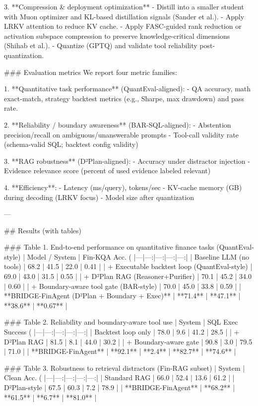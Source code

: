 3. **Compression & deployment optimization**  
- Distill into a smaller student with Muon optimizer and KL-based distillation signals (Sander et al.).  
- Apply LRKV attention to reduce KV cache.  
- Apply FASC-guided rank reduction or activation subspace compression to preserve knowledge-critical dimensions (Shihab et al.).  
- Quantize (GPTQ) and validate tool reliability post-quantization.

### Evaluation metrics  
We report four metric families:

1. **Quantitative task performance** (QuantEval-aligned):  
- QA accuracy, math exact-match, strategy backtest metrics (e.g., Sharpe, max drawdown) and pass rate.

2. **Reliability / boundary awareness** (BAR-SQL-aligned):  
- Abstention precision/recall on ambiguous/unanswerable prompts  
- Tool-call validity rate (schema-valid SQL; backtest config validity)

3. **RAG robustness** (D²Plan-aligned):  
- Accuracy under distractor injection  
- Evidence relevance score (percent of used evidence labeled relevant)

4. **Efficiency**:  
- Latency (ms/query), tokens/sec  
- KV-cache memory (GB) during decoding (LRKV focus)  
- Model size after quantization

---

## Results (with tables)  

### Table 1. End-to-end performance on quantitative finance tasks (QuantEval-style)
| Model / System | Fin-KQA Acc. (%
|---|---:|---:|---:|---:|
| Baseline LLM (no tools) | 68.2 | 41.5 | 22.0 | 0.41 |
| + Executable backtest loop (QuantEval-style) | 69.0 | 43.0 | 31.5 | 0.55 |
| + D²Plan RAG (Reasoner+Purifier) | 70.1 | 45.2 | 34.0 | 0.60 |
| + Boundary-aware tool gate (BAR-style) | 70.0 | 45.0 | 33.8 | 0.59 |
| **BRIDGE-FinAgent (D²Plan + Boundary + Exec)** | **71.4** | **47.1** | **38.6** | **0.67** |

### Table 2. Reliability and boundary-aware tool use
| System | SQL Exec Success (%
|---|---:|---:|---:|---:|
| Backtest loop only | 78.0 | 9.6 | 41.2 | 28.5 |
| + D²Plan RAG | 81.5 | 8.1 | 44.0 | 30.2 |
| + Boundary-aware gate | 90.8 | 3.0 | 79.5 | 71.0 |
| **BRIDGE-FinAgent** | **92.1** | **2.4** | **82.7** | **74.6** |

### Table 3. Robustness to retrieval distractors (Fin-RAG subset)
| System | Clean Acc. (%
|---|---:|---:|---:|---:|
| Standard RAG | 66.0 | 52.4 | 13.6 | 61.2 |
| D²Plan-style | 67.5 | 60.3 | 7.2 | 78.9 |
| **BRIDGE-FinAgent** | **68.2** | **61.5** | **6.7** | **81.0** |

